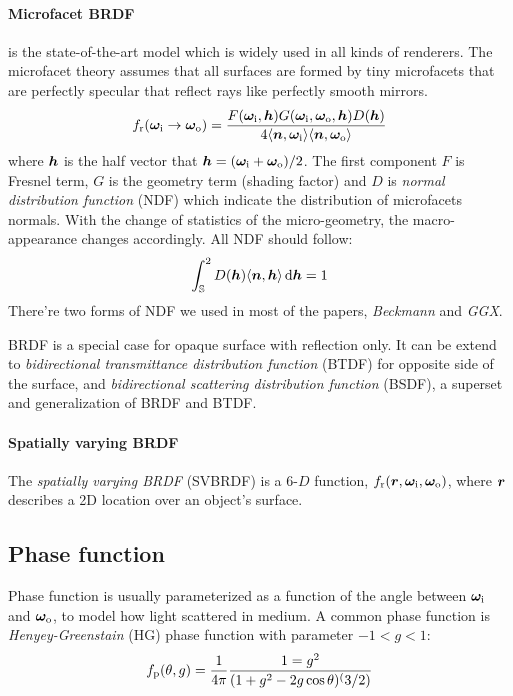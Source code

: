 \paragraph{Microfacet BRDF} is the state-of-the-art model which is widely used in all kinds of renderers. The microfacet theory assumes that all surfaces are formed by tiny microfacets that are perfectly specular that reflect rays like perfectly smooth mirrors.
\begin{equation}
	f_\mathrm{r}(\bm\omega_\mathrm{i}\rightarrow\bm\omega_\mathrm{o}) = 
	\frac{F(\bm\omega_\mathrm{i}, \bm{h}) G(\bm\omega_\mathrm{i},\bm\omega_\mathrm{o},\bm{h}) D(\bm{h})}
	{4{\langle \bm{n},\bm\omega_\mathrm{i} \rangle}{\langle \bm{n},\bm\omega_\mathrm{o} \rangle}}
\end{equation}
where $\bm{h}$ is the half vector that $\bm{h}=(\bm\omega_\mathrm{i}+\bm\omega_\mathrm{o})/2$. The first component $F$ is Fresnel term, $G$ is the geometry term (shading factor) and $D$ is \emph{normal distribution function} (NDF) which indicate the distribution of microfacets normals. With the change of statistics of the micro-geometry, the macro-appearance changes accordingly.
All NDF should follow:
\begin{equation}
	\int_\mathbb{S}^2 D(\bm{h}){\langle \bm{n},\bm{h} \rangle} \,\mathrm{d}\bm{h} = 1
\end{equation}
There're two forms of NDF we used in most of the papers, \emph{Beckmann} and \emph{GGX}.

BRDF is a special case for opaque surface with reflection only. It can be extend to \emph{bidirectional transmittance distribution function} (BTDF) for  opposite side of the surface, and \emph{bidirectional scattering distribution function} (BSDF), a superset and generalization of BRDF and BTDF.

%


\paragraph{Spatially varying BRDF}
The \emph{spatially varying BRDF} (SVBRDF) is a 6-$D$ function, $f_\mathrm{r}(\bm{r},\bm\omega_\mathrm{i},\bm\omega_\mathrm{o})$, where $\bm{r}$ describes a 2D location over an object's surface.


\subsection{Phase function}
Phase function is usually parameterized as a function of the angle between $\bm\omega_\mathrm{i}$ and $\bm\omega_\mathrm{o}$, to model how light scattered in medium. A common phase function is \emph{Henyey-Greenstain} (HG) phase function with parameter $-1<g<1$:
\begin{equation}
	f_\mathrm{p}(\theta,g) = \frac{1}{4\pi}
	\frac{1=g^2}
	{(1+g^2-2g\cos\theta)^(3/2)}
\end{equation}


